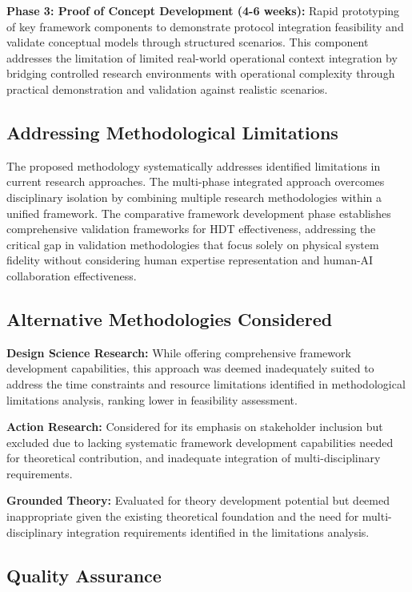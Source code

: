 \documentclass[12pt,a4paper]{article}
\begin{document}
\textbf{Phase 3: Proof of Concept Development (4-6 weeks):} Rapid prototyping of key framework components to demonstrate protocol integration feasibility and validate conceptual models through structured scenarios. This component addresses the limitation of limited real-world operational context integration by bridging controlled research environments with operational complexity through practical demonstration and validation against realistic scenarios.

\subsection{Addressing Methodological Limitations}

The proposed methodology systematically addresses identified limitations in current research approaches. The multi-phase integrated approach overcomes disciplinary isolation by combining multiple research methodologies within a unified framework. The comparative framework development phase establishes comprehensive validation frameworks for HDT effectiveness, addressing the critical gap in validation methodologies that focus solely on physical system fidelity without considering human expertise representation and human-AI collaboration effectiveness.

\subsection{Alternative Methodologies Considered}

\textbf{Design Science Research:} While offering comprehensive framework development capabilities, this approach was deemed inadequately suited to address the time constraints and resource limitations identified in methodological limitations analysis, ranking lower in feasibility assessment.

\textbf{Action Research:} Considered for its emphasis on stakeholder inclusion but excluded due to lacking systematic framework development capabilities needed for theoretical contribution, and inadequate integration of multi-disciplinary requirements.

\textbf{Grounded Theory:} Evaluated for theory development potential but deemed inappropriate given the existing theoretical foundation and the need for multi-disciplinary integration requirements identified in the limitations analysis.

\subsection{Quality Assurance}
\end{document}
